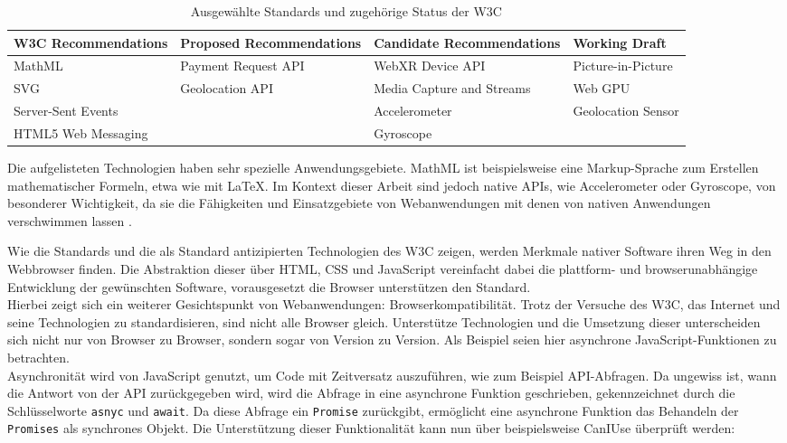\documentclass[a4paper]{scrartcl}
\begin{document}
\begin{table}[H]
	\centering
	\caption{Ausgewählte Standards und zugehörige Status der W3C}
	\begin{center}
		\begin{tabularx}{\linewidth}{| Y | Y | Y | Y |}
			\hline
			\textbf{W3C Recommendations} & \textbf{Proposed Recommendations} & \textbf{Candidate Recommendations} & \textbf{Working Draft} \\
			\hline \hline
			MathML & Payment Request API & WebXR Device API & Picture-in-Picture \\
			\hline
			SVG & Geolocation API & Media Capture and Streams & Web GPU \\
			\hline
			Server-Sent Events & & Accelerometer & Geolocation Sensor \\
			\hline
			HTML5 Web Messaging & & Gyroscope & \\
			\hline
		\end{tabularx}
	\end{center}	
	Die aufgelisteten Technologien haben sehr spezielle Anwendungsgebiete. MathML ist beispielsweise eine Markup-Sprache zum Erstellen mathematischer Formeln, etwa wie mit \LaTeX. Im Kontext dieser Arbeit sind jedoch native APIs, wie Accelerometer oder Gyroscope, von besonderer Wichtigkeit, da sie die Fähigkeiten und Einsatzgebiete von Webanwendungen mit denen von nativen Anwendungen verschwimmen lassen \autocite{W3C}.
\end{table}

Wie die Standards und die als Standard antizipierten Technologien des W3C zeigen, werden Merkmale nativer Software ihren Weg in den Webbrowser finden. Die Abstraktion dieser über HTML, CSS und JavaScript vereinfacht dabei die plattform- und browserunabhängige Entwicklung der gewünschten Software, vorausgesetzt die Browser unterstützen den Standard. \\

Hierbei zeigt sich ein weiterer Gesichtspunkt von Webanwendungen: Browserkompatibilität. Trotz der Versuche des W3C, das Internet und seine Technologien zu standardisieren, sind nicht alle Browser gleich. Unterstütze Technologien und die Umsetzung dieser unterscheiden sich nicht nur von Browser zu Browser, sondern sogar von Version zu Version. Als Beispiel seien hier asynchrone JavaScript-Funktionen zu betrachten. \\
 Asynchronität wird von JavaScript genutzt, um Code mit Zeitversatz auszuführen, wie zum Beispiel API-Abfragen. Da ungewiss ist, wann die Antwort von der API zurückgegeben wird, wird die Abfrage in eine asynchrone Funktion geschrieben, gekennzeichnet durch die Schlüsselworte \texttt{asnyc} und \texttt{await}. Da diese Abfrage ein \texttt{Promise} zurückgibt, ermöglicht eine asynchrone Funktion das Behandeln der \texttt{Promises} als synchrones Objekt. Die Unterstützung dieser Funktionalität kann nun über beispielsweise CanIUse überprüft werden: 
 
\end{document}
